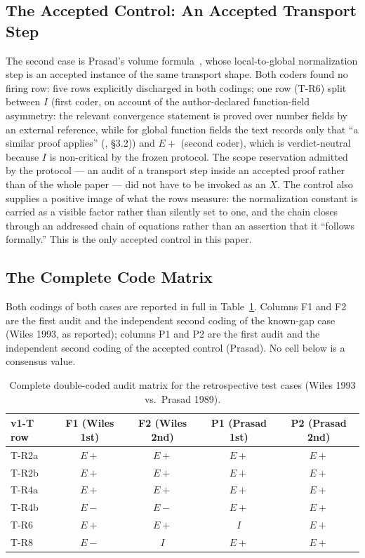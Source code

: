 \documentclass[11pt,a4paper]{article}
\begin{document}
\subsection{The Accepted Control: An Accepted Transport Step}

The second case is Prasad's volume formula~\cite{prasad}, whose
local-to-global normalization step is an accepted instance of the same
transport shape. Both coders found no firing row: five rows explicitly
discharged in both codings; one row (T-R6) split between $I$ (first coder,
on account of the author-declared function-field asymmetry: the relevant
convergence statement is proved over number fields by an external
reference, while for global function fields the text records only that ``a
similar proof applies'' (\cite{prasad}, \S3.2)) and $E{+}$
(second coder), which is verdict-neutral because $I$ is non-critical by the
frozen protocol. The scope reservation admitted by the protocol --- an audit of
a transport step inside an accepted proof rather than of the whole paper --- did
not have to be invoked as an $X$. The control also supplies a positive image of
what the rows measure: the normalization constant is carried as a visible factor
rather than silently set to one, and the chain closes through an addressed
chain of equations rather than an assertion that it ``follows formally.''
This is the only accepted control in this paper.

\subsection{The Complete Code Matrix}\label{sec:matrix}

Both codings of both cases are reported in full in Table~\ref{tab:code_matrix_retrospective}. Columns F1 and F2 are the
first audit and the independent second coding of the known-gap case (Wiles
1993, as reported); columns P1 and P2 are the first audit and the independent
second coding of the accepted control (Prasad). No cell below is a consensus
value.

\begin{table}[htbp]
\centering
\small
\setlength{\tabcolsep}{3.5pt}
\caption{Complete double-coded audit matrix for the retrospective test cases (Wiles 1993 vs.\ Prasad 1989).}
\label{tab:code_matrix_retrospective}
\begin{tabular}{@{}lcccc@{}}
\toprule
v1-T row & F1 (Wiles 1st) & F2 (Wiles 2nd) & P1 (Prasad 1st) & P2 (Prasad 2nd) \\
\midrule
T-R2a & $E{+}$ & $E{+}$ & $E{+}$ & $E{+}$ \\
\addlinespace[3pt]
T-R2b & $E{+}$ & $E{+}$ & $E{+}$ & $E{+}$ \\
\addlinespace[3pt]
T-R4a & $E{+}$ & $E{+}$ & $E{+}$ & $E{+}$ \\
\addlinespace[3pt]
T-R4b & $E{-}$ & $E{-}$ & $E{+}$ & $E{+}$ \\
\addlinespace[3pt]
T-R6 & $E{+}$ & $E{+}$ & $I$ & $E{+}$ \\
\addlinespace[3pt]
T-R8 & $E{-}$ & $I$ & $E{+}$ & $E{+}$ \\
\bottomrule
\end{tabular}
\end{table}
\end{document}
